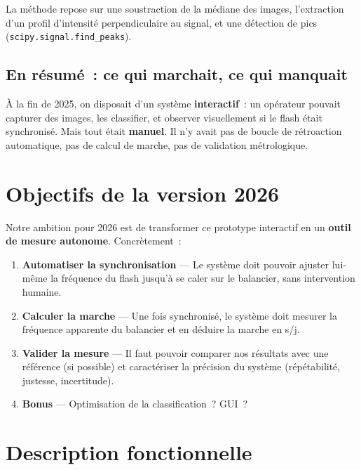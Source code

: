 \documentclass[a4paper,11pt]{article}
\newcommand{\code}[1]{\colorbox{codebg}{\texttt{#1}}}
\begin{document}
La méthode repose sur une soustraction de la médiane des images, l'extraction d'un profil d'intensité perpendiculaire au signal, et une détection de pics (\code{scipy.signal.find\_peaks}).

\subsection{En résumé~: ce qui marchait, ce qui manquait}

À la fin de 2025, on disposait d'un système \textbf{interactif}~: un opérateur pouvait capturer des images, les classifier, et observer visuellement si le flash était synchronisé. Mais tout était \textbf{manuel}. Il n'y avait pas de boucle de rétroaction automatique, pas de calcul de marche, pas de validation métrologique.

\section{Objectifs de la version 2026}

Notre ambition pour 2026 est de transformer ce prototype interactif en un \textbf{outil de mesure autonome}. Concrètement~:

\begin{enumerate}
    \item \textbf{Automatiser la synchronisation} --- Le système doit pouvoir ajuster lui-même la fréquence du flash jusqu'à se caler sur le balancier, sans intervention humaine.

    \item \textbf{Calculer la marche} --- Une fois synchronisé, le système doit mesurer la fréquence apparente du balancier et en déduire la marche en s/j.

    \item \textbf{Valider la mesure} --- Il faut pouvoir comparer nos résultats avec une référence (si possible) et caractériser la précision du système (répétabilité, justesse, incertitude).

    \item \textbf{Bonus} --- Optimisation de la classification~? GUI~?
\end{enumerate}

\section{Description fonctionnelle}
\end{document}
